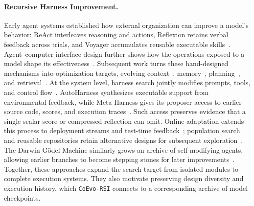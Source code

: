 \documentclass[11pt,a4paper]{article}
\newcommand{\ourmethod}{\texttt{CoEvo-RSI}}
\begin{document}
\paragraph{Recursive Harness Improvement.}
Early agent systems established how external organization can improve a model's behavior: ReAct interleaves reasoning and actions, Reflexion retains verbal feedback across trials, and Voyager accumulates reusable executable skills~\citep{yao2023react,shinn2023reflexion,wang2023voyager}. Agent--computer interface design further shows how the operations exposed to a model shape its effectiveness~\citep{yang2024sweagent}. Subsequent work turns these hand-designed mechanisms into optimization targets, evolving context~\citep{zhang2025ace}, memory~\citep{zhang2025memevolve,zhang2026memskill,pan2026mstar}, planning~\citep{liu2026todoevolve}, and retrieval~\citep{lee2026selfindex}. At the system level, harness search jointly modifies prompts, tools, and control flow~\citep{lee2026rhi,lee2026metaharness,lin2026ahe,lou2026autoharness,zhang2026selfharness,zhang2026hyperagents}. AutoHarness synthesizes executable support from environmental feedback, while Meta-Harness gives its proposer access to earlier source code, scores, and execution traces~\citep{lou2026autoharness,lee2026metaharness}. Such access preserves evidence that a single scalar score or compressed reflection can omit. Online adaptation extends this process to deployment streams and test-time feedback~\citep{liu2026adaptiveharness,nie2026tthe,pan2026rho}; population search and reusable repositories retain alternative designs for subsequent exploration~\citep{zhang2026darwinx,nie2026evolvenet,luo2026harnessbank}. The Darwin G\"odel Machine similarly grows an archive of self-modifying agents, allowing earlier branches to become stepping stones for later improvements~\citep{zhang2025dgm}. Together, these approaches expand the search target from isolated modules to complete execution systems. They also motivate preserving design diversity and execution history, which \ourmethod{} connects to a corresponding archive of model checkpoints.
\end{document}
